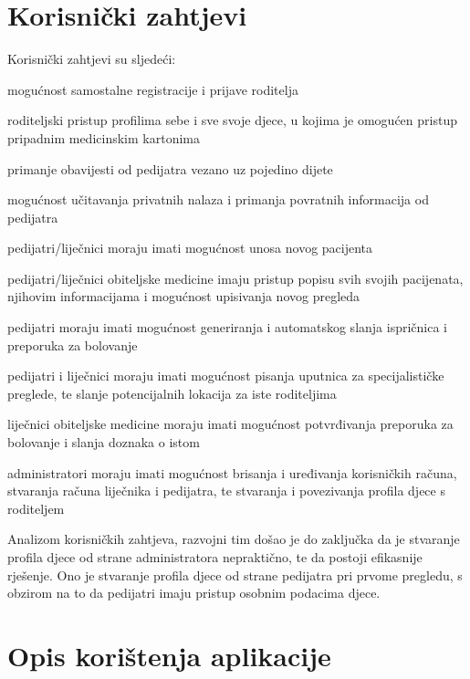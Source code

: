 		\section{Korisnički zahtjevi}
		Korisnički zahtjevi su sljedeći:
		\begin{packed_item}
			
			\item  mogućnost samostalne registracije i prijave roditelja
			\item  roditeljski pristup profilima sebe i sve svoje djece, u kojima je omogućen pristup pripadnim medicinskim kartonima
			\item  primanje obavijesti od pedijatra vezano uz pojedino dijete
			\item  mogućnost učitavanja privatnih nalaza i primanja povratnih informacija od pedijatra
			\item  pedijatri/liječnici moraju imati mogućnost unosa novog pacijenta
			\item  pedijatri/liječnici obiteljske medicine imaju pristup popisu svih svojih pacijenata, njihovim informacijama i mogućnost upisivanja novog pregleda
			\item  pedijatri moraju imati mogućnost generiranja i automatskog slanja ispričnica i preporuka za bolovanje
			\item  pedijatri i liječnici moraju imati mogućnost pisanja uputnica za specijalističke preglede, te slanje potencijalnih lokacija za iste roditeljima
			\item  liječnici obiteljske medicine moraju imati mogućnost potvrđivanja preporuka za bolovanje i slanja doznaka o istom
			\item  administratori moraju imati mogućnost brisanja i uređivanja korisničkih računa, stvaranja računa liječnika i pedijatra, te stvaranja i povezivanja profila djece s roditeljem
			
		\end{packed_item}
		Analizom korisničkih zahtjeva, razvojni tim došao je do zaključka da je stvaranje profila djece od strane administratora nepraktično, te da postoji efikasnije rješenje. Ono je stvaranje profila djece od strane pedijatra pri prvome pregledu, s obzirom na to da pedijatri imaju pristup osobnim podacima djece. 
		
		\section{Opis korištenja aplikacije}
		
